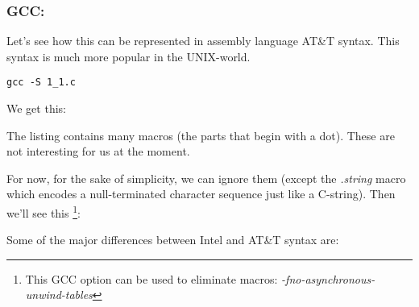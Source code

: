\subsubsection{GCC: \ATTSyntax}
\label{ATT_syntax}

Let's see how this can be represented in assembly language AT\&T syntax.
This syntax is much more popular in the UNIX-world.

\begin{lstlisting}[caption=let's compile in GCC 4.7.3]
gcc -S 1_1.c
\end{lstlisting}

We get this:



The listing contains many macros (the parts that begin with a dot). These are not interesting for us at the moment.

For now, for the sake of simplicity, we can ignore them (except the \emph{.string} macro which
encodes a null-terminated character sequence just like a C-string). Then we'll see this
\footnote{This GCC option can be used to eliminate  macros: \emph{-fno-asynchronous-unwind-tables}}:



\myindex{\ATTSyntax}
\myindex{\IntelSyntax}
Some of the major differences between Intel and AT\&T syntax are:

